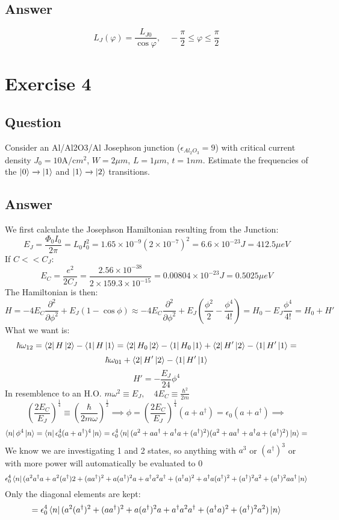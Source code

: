 \documentclass{article}
\begin{document}
\subsection{Answer}
$$L_J(\varphi) = \frac{L_{J0}}{\cos{\varphi}},\quad -\frac{\pi}{2} \le \varphi \le \frac{\pi}{2}$$

\section{Exercise 4}
\subsection{Question}
Consider an Al/Al2O3/Al Josephson junction ($\epsilon_{Al_2O_3} = 9$) with critical current density $J_0 = 10 \text{A/c$m^2$}$, $W = 2 \mu m$, $L = 1 \mu m$, $t = 1nm$. Estimate the frequencies of the $\ket{0} \xrightarrow{} \ket{1}$ and $\ket{1} \xrightarrow{} \ket{2}$ transitions.  
\subsection{Answer}
We first calculate the Josephson Hamiltonian resulting from the Junction:
$$E_{J} = \frac{\Phi_0 I_0}{2\pi} = L_0I_0^2 = 1.65\times 10^{-9}(2\times 10^{-7})^2 = 6.6\times 10^{-23}J = 412.5\mu eV$$
If $C << C_J$:
$$E_C = \frac{e^2}{2C_J} = \frac{2.56\times 10^{-38}}{2\times 159.3\times 10^{-15}}= 0.00804 \times 10^{-23}J = 0.5025 \mu eV$$
The Hamiltonian is then:
$$H = -4E_C\frac{\partial^2}{\partial\phi^2} + E_J(1-\cos{\phi}) \approx -4E_C\frac{\partial^2}{\partial\phi^2} + E_J(\frac{\phi^2}{2} - \frac{\phi^4}{4!}) = H_0 - E_J\frac{\phi^4}{4!} = H_0 + H'$$
What we want is:
$$\hbar \omega_{12} = \bra{2}H\ket{2} - \bra{1}H\ket{1} = \bra{2}H_0\ket{2} - \bra{1}H_0\ket{1} + \bra{2}H'\ket{2} - \bra{1}H'\ket{1} = $$
$$\hbar\omega_{01} + \bra{2}H'\ket{2} - \bra{1}H'\ket{1} $$
$$H' = -\frac{E_J}{24}\phi^4$$
In resemblence to an H.O. $m\omega^2 \equiv E_J,\quad 4E_C \equiv \frac{\hbar^2}{2m}$
$$(\frac{2E_C}{E_J})^{\frac{1}{4}} \equiv (\frac{\hbar}{2m\omega})^{\frac{1}{2}} \implies \phi = (\frac{2E_C}{E_J})^{\frac{1}{4}}(a+a^\dagger) = \epsilon_0(a+a^\dagger) \implies $$
$$\bra{n}\phi^4\ket{n} = \bra{n}\epsilon_0^4(a+a^\dagger)^4\ket{n} = \epsilon_0^4\bra{n}(a^2 + aa^\dagger + a^\dagger a + (a^\dagger)^2)(a^2 + aa^\dagger + a^\dagger a + (a^\dagger)^2)\ket{n} = $$
We know we are investigating 1 and 2 states, so anything with $a^3$ or $(a^\dagger)^3$ or with more power will automatically be evaluated to 0
$$\epsilon_0^4\bra{n}(a^2a^\dagger a + a^2(a^\dagger)2 + (aa^\dagger)^2 + a(a^\dagger)^2a + a^\dagger a^2a^\dagger + (a^\dagger a)^2 + a^\dagger a(a^\dagger)^2 + (a^\dagger)^2 a^2 + (a^\dagger)^2aa^\dagger\ket{n}$$
Only the diagonal elements are kept:
$$= \epsilon_0^4\bra{n}(a^2(a^\dagger)^2 + (aa^\dagger)^2 + a(a^\dagger)^2a + a^\dagger a^2a^\dagger + (a^\dagger a)^2+(a^\dagger)^2 a^2)\ket{n}$$
\end{document}
